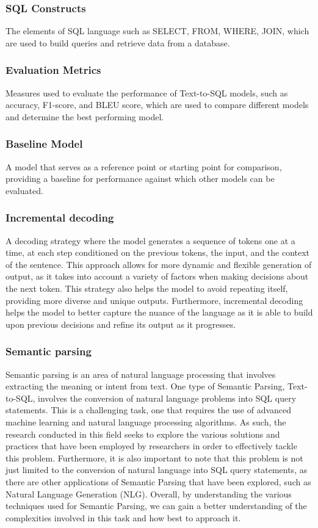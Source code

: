 \subsubsection{SQL Constructs} The elements of SQL language such as SELECT, FROM, WHERE, JOIN, which are used to build queries and retrieve data from a database.
\subsubsection{Evaluation Metrics} Measures used to evaluate the performance of Text-to-SQL models, such as accuracy, F1-score, and BLEU score, which are used to compare different models and determine the best performing model.
\subsubsection{Baseline Model} A model that serves as a reference point or starting point for comparison, providing a baseline for performance against which other models can be evaluated.
\subsubsection{Incremental decoding} A decoding strategy where the model generates a sequence of tokens one at a time, at each step conditioned on the previous tokens, the input, and the context of the sentence. This approach allows for more dynamic and flexible generation of output, as it takes into account a variety of factors when making decisions about the next token. This strategy also helps the model to avoid repeating itself, providing more diverse and unique outputs. Furthermore, incremental decoding helps the model to better capture the nuance of the language as it is able to build upon previous decisions and refine its output as it progresses\cite{huang-mi-2010-efficient}.
\subsubsection{Semantic parsing} Semantic parsing\cite{krishnamurthy-etal-2017-neural} is an area of natural language processing that involves extracting the meaning or intent from text. One type of Semantic Parsing, Text-to-SQL, involves the conversion of natural language problems into SQL query statements. This is a challenging task, one that requires the use of advanced machine learning and natural language processing algorithms. As such, the research conducted in this field seeks to explore the various solutions and practices that have been employed by researchers in order to effectively tackle this problem. Furthermore, it is also important to note that this problem is not just limited to the conversion of natural language into SQL query statements, as there are other applications of Semantic Parsing that have been explored, such as Natural Language Generation (NLG). Overall, by understanding the various techniques used for Semantic Parsing, we can gain a better understanding of the complexities involved in this task and how best to approach it.